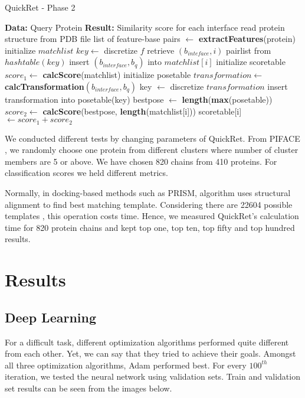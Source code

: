 \documentclass{article}
\begin{document}
\begin{algorithm}
\caption{QuickRet - Phase 2}\label{euclid}
\begin{algorithmic}[1]
\State \textbf{Data:} Query Protein
\State \textbf{Result:} Similarity score for each interface
\State read protein structure from PDB file
\State list of feature-base pairs $\leftarrow$ \textbf{extractFeatures}(protein)
\State initialize $matchlist$
\State $key \leftarrow$ discretize $f$
\State retrieve $(b_{inteface}, i)$ pairlist from $hashtable(key)$
\State insert $(b_{interface}, b_q)$ into $matchlist[i]$
\EndFor
\EndFor
\State initialize scoretable
\State $score_1 \leftarrow$ \textbf{calcScore}(matchlist)
\State initialize posetable
\State $transformation \leftarrow$ \textbf{calcTransformation}$(b_{interface},b_q)$
\State key $\leftarrow$ discretize $transformation$
\State insert transformation into posetable(key)
\EndFor
\State bestpose $\leftarrow$ \textbf{length}(\textbf{max}(posetable))
\State $score_2 \leftarrow$ \textbf{calcScore}(bestpose, \textbf{length}(matchlist[i]))
\State scoretable[i] $\leftarrow score_1 + score_2$
\EndFor
\end{algorithmic}
\end{algorithm}

We conducted different tests by changing parameters of QuickRet. From PIFACE \citep{RN5}, we randomly choose one protein from different clusters where number of cluster members are 5 or above. We have chosen 820 chains from 410 proteins. For classification scores we held different metrics.

Normally, in docking-based methods such as PRISM, algorithm uses structural alignment \cite{shatsky2004method} to find best matching template. Considering there are 22604 possible templates \citep{RN5}, this operation costs time. Hence, we measured QuickRet's calculation time for 820 protein chains and kept top one, top ten, top fifty and top hundred results.

\section{Results}
\subsection{Deep Learning}
For a difficult task, different optimization algorithms performed quite different from each other. Yet, we can say that they tried to achieve their goals. Amongst all three optimization algorithms, Adam\citep{kingma2014adam} performed best. For every $100^{th}$ iteration, we tested the neural network using validation sets. Train and validation set results can be seen from the images below.
\end{document}

